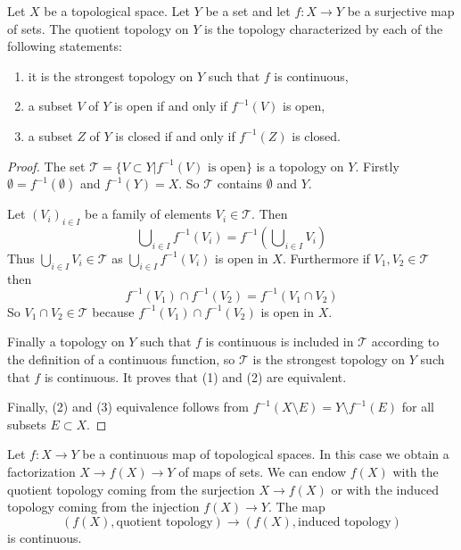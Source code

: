 \begin{lemma}
\label{lemma-quotient}
Let $X$ be a topological space. Let $Y$ be a set and let $f : X \to Y$
be a surjective map of sets. The quotient topology on $Y$ is the
topology characterized by each of the following statements:
\begin{enumerate}
\item it is the strongest topology on $Y$ such that $f$ is continuous,
\item a subset $V$ of $Y$ is open if and only if $f^{-1}(V)$ is open,
\item a subset $Z$ of $Y$ is closed if and only if $f^{-1}(Z)$ is closed.
\end{enumerate}
\end{lemma}

\begin{proof}
The set $\mathcal{T} = \{V\subset Y | f^{-1}(V) \text{ is open}\}$ is a
topology on $Y$. Firstly $\emptyset = f^{-1}(\emptyset)$ and $f^{-1}(Y) = X$.
So $\mathcal{T}$ contains $\emptyset$ and $Y$.

\medskip\noindent
Let $(V_i)_{i \in I}$ be a family of elements $V_i \in \mathcal{T}$.
Then
$$
\bigcup\nolimits_{i\in I} f^{-1}(V_i) =
f^{-1}\left(\bigcup\nolimits_{i\in I} V_i\right)
$$
Thus $\bigcup_{i\in I} V_i \in \mathcal{T}$ as
$\bigcup_{i\in I}f^{-1}(V_i)$ is open in $X$.
Furthermore if $V_1, V_2 \in \mathcal{T}$ then
$$
f^{-1}(V_1) \cap f^{-1}(V_2) = f^{-1}(V_1 \cap V_2)
$$
So $V_1 \cap V_2 \in \mathcal{T}$ because
$f^{-1}(V_1) \cap f^{-1}(V_2)$ is open in $X$.

\medskip\noindent
Finally a topology on $Y$ such that $f$ is continuous is included in
$\mathcal{T}$ according to the definition of a continuous function, so
$\mathcal{T}$ is the strongest topology on $Y$ such that $f$ is continuous. It
proves that (1) and (2) are equivalent.

\medskip\noindent
Finally, (2) and (3) equivalence follows from $f^{-1}(X\setminus E) = Y
\setminus f^{-1}(E)$ for all subsets $E \subset X$.
\end{proof}

\noindent
Let $f : X \to Y$ be a continuous map of topological spaces.
In this case we obtain a factorization $X \to f(X) \to Y$
of maps of sets. We can endow $f(X)$ with the
quotient topology coming from the surjection $X \to f(X)$
or with the induced topology coming from the injection $f(X) \to Y$.
The map
$$
(f(X), \text{quotient topology})
\longrightarrow
(f(X), \text{induced topology})
$$
is continuous.

